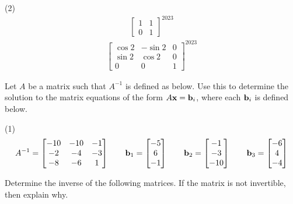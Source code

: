 \begin{tasks}[resume, style=enumerate](2)
\task
  \begin{align*}
    \begin{bmatrix}
      1 & 1 \\
      0 & 1
    \end{bmatrix}^{2023}
  \end{align*}
\task
  \begin{align*}
    \begin{bmatrix}
      \cos2 & -\sin2 & 0 \\
      \sin2 & \cos2 & 0 \\
      0 & 0 & 1
    \end{bmatrix}^{2023}
  \end{align*}
\end{tasks}
Let $A$ be a matrix such that $A^{-1}$ is defined as below.  Use this to
determine the solution to the matrix equations of the form $A\mathbf x =
\mathbf b_i$, where each $\mathbf b_i$ is defined below.
\begin{tasks}[resume, style=enumerate](1)
\task
  \begin{align*}
    A^{-1} =
    \begin{bmatrix}
      -10 & -10 & -1 \\
      -2 & -4 & -3 \\
      -8 & -6 & 1
    \end{bmatrix}
    \qquad
    \mathbf b_{1} = \begin{bmatrix} -5 \\ 6 \\ -1 \end{bmatrix}
    \qquad
    \mathbf b_{2} = \begin{bmatrix} -1 \\ -3 \\ -10 \end{bmatrix}
    \qquad
    \mathbf b_{3} = \begin{bmatrix} -6 \\ 4 \\ -4 \end{bmatrix}
  \end{align*}
\end{tasks}
Determine the inverse of the following matrices.
If the matrix is not invertible, then explain why.
